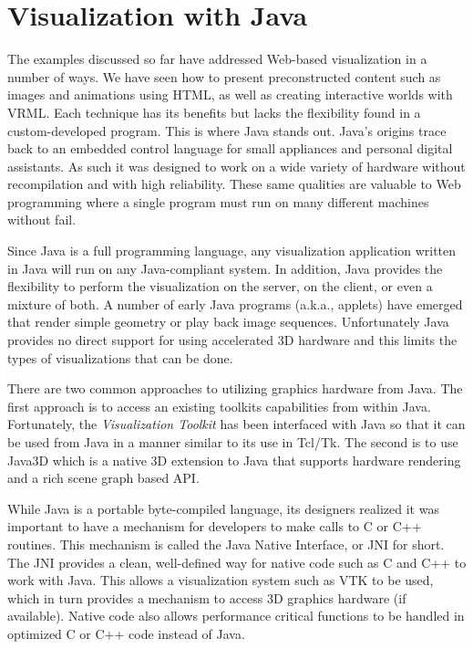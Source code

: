 \section{Visualization with Java}

The examples discussed so far have addressed Web-based visualization in a number of ways. We have seen how to present preconstructed content such as images and animations using HTML, as well as creating interactive worlds with VRML. Each technique has its benefits but lacks the flexibility found in a custom-developed program. This is where Java stands out. Java's origins trace back to an embedded control language for small appliances and personal digital assistants. As such it was designed to work on a wide variety of hardware without recompilation and with high reliability. These same qualities are valuable to Web programming where a single program must run on many different machines without fail.

Since Java is a full programming language, any visualization application written in Java will run on any Java-compliant system. In addition, Java provides the flexibility to perform the visualization on the server, on the client, or even a mixture of both. A number of early Java programs (a.k.a., applets) have emerged that render simple geometry or play back image sequences. Unfortunately Java provides no direct support for using accelerated 3D hardware and this limits the types of visualizations that can be done.

There are two common approaches to utilizing graphics hardware from Java. The first approach is to access an existing toolkits capabilities from within Java. Fortunately, the \emph{Visualization Toolkit} has been interfaced with Java so that it can be used from Java in a manner similar to its use in Tcl/Tk. The second is to use Java3D which is a native 3D extension to Java that supports hardware rendering and a rich scene graph based API.

While Java is a portable byte-compiled language, its designers realized it was important to have a mechanism for developers to make calls to C or C++ routines. This mechanism is called the Java Native Interface, or JNI for short. The JNI provides a clean, well-defined way for native code such as C and C++ to work with Java. This allows a visualization system such as VTK to be used, which in turn provides a mechanism to access 3D graphics hardware (if available). Native code also allows performance critical functions to be handled in optimized C or C++ code instead of Java.

